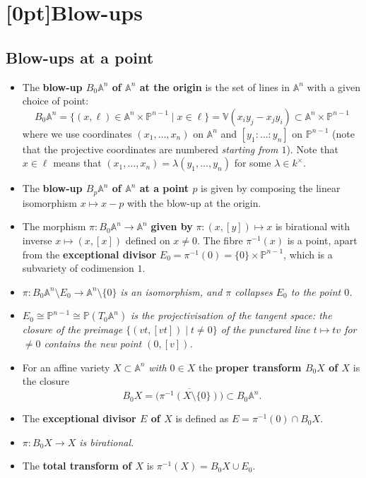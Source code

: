 \documentclass[10pt]{article}
\newcommand{\van}{\mathbb{V}}
\newcommand{\aff}{\mathbb{A}}
\newcommand{\pee}{\mathbb{P}}
\newcommand{\AG}{\textcolor{green}{AG}}
\begin{document}
    \section{\protect\marginnote{\AG}[0pt]Blow-ups}

        \subsection{Blow-ups at a point}

            \begin{itemize}
                \item The \textbf{blow-up $B_0\aff^n$ of $\aff^n$ at the origin} is the set of lines in $\aff^n$ with a given choice of point:
                    \begin{equation*}
                        B_0\aff^n = \big\{(x,\ell)\in\aff^n\times\pee^{n-1}\mid x\in\ell\big\} = \van(x_iy_j-x_jy_i)\subset\aff^n\times\pee^{n-1}
                    \end{equation*}
                    where we use coordinates $(x_1,\ldots,x_n)$ on $\aff^n$ and $[y_1:\ldots:y_n]$ on $\pee^{n-1}$ (note that the projective coordinates are numbered \emph{starting from $1$}).
                    Note that $x\in\ell$ means that $(x_1,\ldots,x_n)=\lambda(y_1,\ldots,y_n)$ for some $\lambda\in k^\times$.
                \item The \textbf{blow-up $B_p\aff^n$ of $\aff^n$ at a point $p$} is given by composing the linear isomorphism $x\mapsto x-p$ with the blow-up at the origin.
                \item The morphism $\pi\colon B_0\aff^n\to\aff^n$ \textbf{given by} $\pi\colon(x,[y])\mapsto x$ is birational with inverse $x\mapsto(x,[x])$ defined on $x\neq0$.
                    The fibre $\pi^{-1}(x)$ is a point, apart from the \textbf{exceptional divisor} $E_0=\pi^{-1}(0)=\{0\}\times\pee^{n-1}$, which is a subvariety of codimension $1$.
                \item $\pi\colon B_0\aff^n\setminus E_0\to\aff^n\setminus\{0\}$ \emph{is an isomorphism, and $\pi$ collapses $E_0$ to the point $0$.}
                \item $E_0\cong\pee^{n-1}\cong\pee(T_0\aff^n)$ \emph{is the projectivisation of the tangent space: the closure of the preimage $\{(vt,[vt])\mid t\neq0\}$ of the punctured line $t\mapsto tv$ for $\neq0$ contains the new point $(0,[v])$.}
                \item For an affine variety $X\subset\aff^n$ \emph{with $0\in X$} the \textbf{proper transform $B_0X$ of $X$} is the closure
                    \begin{equation*}
                        B_0X=\overline{\big(\pi^{-1}(X\setminus\{0\})\big)}\subset B_0\aff^n.
                    \end{equation*}
                \item The \textbf{exceptional divisor $E$ of $X$} is defined as $E=\pi^{-1}(0)\cap B_0X$.
                \item \emph{$\pi\colon B_0X\to X$ is birational.}
                \item The \textbf{total transform of $X$} is $\pi^{-1}(X)= B_0X\cup E_0$.
            \end{itemize}
\end{document}
